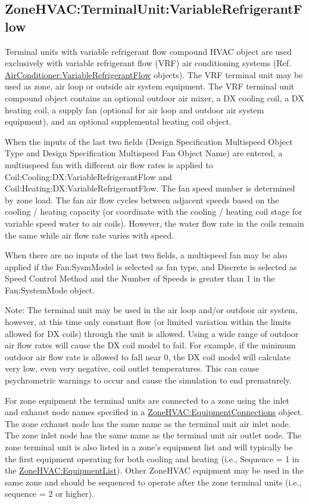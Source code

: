 \subsection{ZoneHVAC:TerminalUnit:VariableRefrigerantFlow}\label{zonehvacterminalunitvariablerefrigerantflow}

Terminal units with variable refrigerant flow compound HVAC object are used exclusively with variable refrigerant flow (VRF) air conditioning systems (Ref. \hyperref[airconditionervariablerefrigerantflow]{AirConditioner:VariableRefrigerantFlow} objects). The VRF terminal unit may be used as zone, air loop or outside air system equipment. The VRF terminal unit compound object contains an optional outdoor air mixer, a DX cooling coil, a DX heating coil, a supply fan (optional for air loop and outdoor air system equipment), and an optional supplemental heating coil object.

When the inputs of the last two fields (Design Specification Multispeed Object Type and Design Specification Multispeed Fan Object Name) are entered, a multiuspeed fan with different air flow rates is applied to Coil:Cooling:DX:VariableRefrigerantFlow and Coil:Heating:DX:VariableRefrigerantFlow.  The fan speed number is determined by zone load. The fan air flow cycles between adjacent speeds based on the cooling / heating capacity (or coordinate with the cooling / heating coil stage for variable speed water to air coils). However, the water flow rate in the coils remain the same while air flow rate varies with speed.

When there are no inputs of the last two fields, a multispeed fan may be also applied if the Fan:SysmModel is selected as fan type, and Discrete is selected as Speed Control Method and the Number of Speeds is greater than 1 in the Fan:SystemMode object.


\begin{callout}
Note: The terminal unit may be used in the air loop and/or outdoor air system, however, at this time only constant flow (or limited variation within the limits allowed for DX coils) through the unit is allowed. Using a wide range of outdoor air flow rates will cause the DX coil model to fail. For example, if the minimum outdoor air flow rate is allowed to fall near 0, the DX coil model will calculate very low, even very negative, coil outlet temperatures. This can cause psychrometric warnings to occur and cause the simulation to end prematurely.
\end{callout}

For zone equipment the terminal units are connected to a zone using the inlet and exhaust node names specified in a \hyperref[zonehvacequipmentconnections]{ZoneHVAC:EquipmentConnections} object. The zone exhaust node has the same name as the terminal unit air inlet node. The zone inlet node has the same name as the terminal unit air outlet node. The zone terminal unit is also listed in a zone's equipment list and will typically be the first equipment operating for both cooling and heating (i.e., Sequence = 1 in the \hyperref[zonehvacequipmentlist]{ZoneHVAC:EquipmentList}). Other ZoneHVAC equipment may be used in the same zone and should be sequenced to operate after the zone terminal units (i.e., sequence = 2 or higher).

